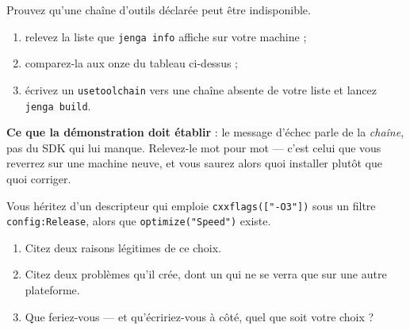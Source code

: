 \begin{nkdemo}
Prouvez qu'une chaîne d'outils déclarée peut être indisponible.

\begin{enumerate}
\item relevez la liste que \texttt{jenga info} affiche sur votre machine ;
\item comparez-la aux onze du tableau ci-dessus ;
\item écrivez un \texttt{usetoolchain} vers une chaîne absente de votre liste et
      lancez \texttt{jenga build}.
\end{enumerate}

\textbf{Ce que la démonstration doit établir} : le message d'échec parle de la
\emph{chaîne}, pas du SDK qui lui manque. Relevez-le mot pour mot --- c'est celui
que vous reverrez sur une machine neuve, et vous saurez alors quoi installer
plutôt que quoi corriger.
\end{nkdemo}

\begin{nklogique}
Vous héritez d'un descripteur qui emploie \texttt{cxxflags(["-O3"])} sous un
filtre \texttt{config:Release}, alors que \texttt{optimize("Speed")} existe.

\begin{enumerate}
\item Citez deux raisons légitimes de ce choix.
\item Citez deux problèmes qu'il crée, dont un qui ne se verra que sur une autre
      plateforme.
\item Que feriez-vous --- et qu'écririez-vous à côté, quel que soit votre choix ?
\end{enumerate}
\end{nklogique}
